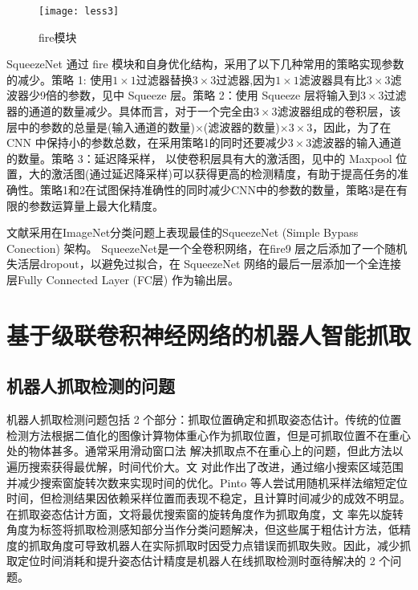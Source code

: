 \documentclass{yangthesis}
\begin{document}
\begin{figure}[!htbp]
	\centering
	\texttt{[image: less3]}
	\caption{f\/ire模块}
     \label{figfire}
\end{figure}

SqueezeNet 通过 f\/ire 模块和自身优化结构，采用了以下几种常用的策略实现参数的减少。策略 1: 使用$1\times1$过滤器替换$3\times3$过滤器,因为$1\times1$滤波器具有比$3\times3$滤波器少9倍的参数，见中 Squeeze 层。策略 2：使用 Squeeze 层将输入到$3\times3$过滤器的通道的数量减少。具体而言，对于一个完全由$3\times3$滤波器组成的卷积层，该层中的参数的总量是(输入通道的数量)$\times$(滤波器的数量)$\times3\times3$，因此，为了在 CNN 中保持小的参数总数，在采用策略1的同时还要减少$3\times3$滤波器的输入通道的数量。策略 3：延迟降采样， 以使卷积层具有大的激活图，见中的 Maxpool 位置，大的激活图(通过延迟降采样)可以获得更高的检测精度，有助于提高任务的准确性。策略1和2在试图保持准确性的同时减少CNN中的参数的数量，策略3是在有限的参数运算量上最大化精度。 

文献\cite{bib:one}采用在ImageNet分类问题上表现最佳的SqueezeNet (Simple Bypass  Conection) 架构。 SqueezeNet是一个全卷积网络，在f\/ire9 层之后添加了一个随机失活层dropout，以避免过拟合，在 SqueezeNet 网络的最后一层添加一个全连接层Fully Connected Layer (FC层) 作为输出层。

\section{基于级联卷积神经网络的机器人智能抓取}

\subsection{机器人抓取检测的问题}

机器人抓取检测问题包括 2 个部分：抓取位置确定和抓取姿态估计。传统的位置检测方法根据二值化的图像计算物体重心作为抓取位置，但是可抓取位置不在重心处的物体甚多。通常采用滑动窗口法 解决抓取点不在重心上的问题，但此方法以遍历搜索获得最优解，时间代价大。文\cite{bibb8} 对此作出了改进，通过缩小搜索区域范围并减少搜索窗旋转次数来实现时间的优化。Pinto 等人尝试用随机采样法缩短定位时间，但检测结果因依赖采样位置而表现不稳定，且计算时间减少的成效不明显。 在抓取姿态估计方面，文\cite{bibb7,bibb10}将最优搜索窗的旋转角度作为抓取角度，文\cite{bibb9} 率先以旋转角度为标签将抓取检测感知部分当作分类问题解决，但这些属于粗估计方法，低精度的抓取角度可导致机器人在实际抓取时因受力点错误而抓取失败。因此，减少抓取定位时间消耗和提升姿态估计精度是机器人在线抓取检测时亟待解决的 2 个问题。
\end{document}
